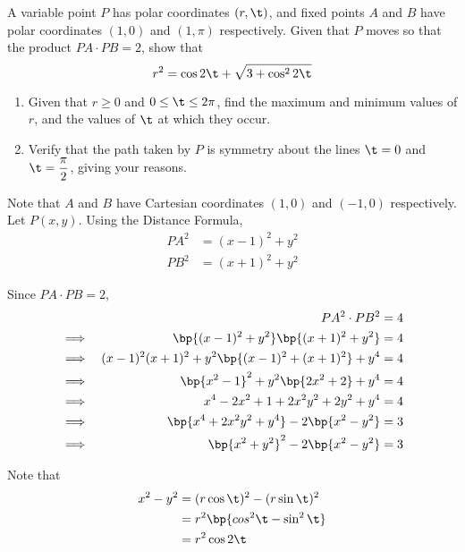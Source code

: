 \documentclass{echw}
\begin{document}

    \problem{}
        A variable point $P$ has polar coordinates $(r, \t)$, and fixed points $A$ and $B$ have polar coordinates $(1, 0)$ and $(1, \pi)$ respectively. Given that $P$ moves so that the product $PA\cdot PB = 2$, show that
        \[
            r^2 = \cos2\t + \sqrt{3 + \cos^22\t}
        \]

        \begin{enumerate}
            \item Given that $r \geq 0$ and $0 \leq \t \leq 2\pi$, find the maximum and minimum values of $r$, and the values of $\t$ at which they occur.
            \item Verify that the path taken by $P$ is symmetry about the lines $\t = 0$ and $\t = \dfrac{\pi}{2}$, giving your reasons.
        \end{enumerate}

    \solution
        Note that $A$ and $B$ have Cartesian coordinates $(1, 0)$ and $(-1, 0)$ respectively. Let $P(x, y)$. Using the Distance Formula,
        \begin{align*}
            PA^2 &= (x-1)^2 + y^2\\
            PB^2 &= (x+1)^2 + y^2
        \end{align*}

        Since $PA \cdot PB = 2$,
        \begin{alignat*}{2}
            &&PA^2 \cdot PB^2 &= 4\\
            \implies&&\bp{(x-1)^2 + y^2}\bp{(x+1)^2 + y^2} &= 4\\
            \implies&&(x-1)^2(x+1)^2 + y^2\bp{(x-1)^2 + (x+1)^2} + y^4 &= 4\\
            \implies&&\bp{x^2 - 1}^2 + y^2\bp{2x^2 + 2} + y^4 &= 4\\
            \implies&&x^4 - 2x^2 + 1 + 2x^2y^2 + 2y^2 + y^4 &= 4\\
            \implies&&\bp{x^4 + 2x^2y^2 + y^4} - 2\bp{x^2 - y^2} &= 3\\
            \implies&&\bp{x^2 + y^2}^2 - 2\bp{x^2 - y^2} &= 3
        \end{alignat*}

        Note that
        \begin{align*}
            x^2 - y^2 &= (r\cos\t)^2 - (r\sin\t)^2\\
            &= r^2 \bp{cos^2\t - \sin^2\t}\\
            &= r^2 \cos2\t
        \end{align*}
\end{document}
